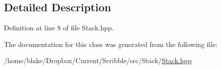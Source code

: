 \subsection{Detailed Description}


Definition at line 8 of file Stack.\-hpp.



The documentation for this class was generated from the following file\-:\begin{DoxyCompactItemize}
\item 
/home/blake/\-Dropbox/\-Current/\-Scribble/src/\-Stack/\hyperlink{_stack_2_stack_8hpp}{Stack.\-hpp}\end{DoxyCompactItemize}
